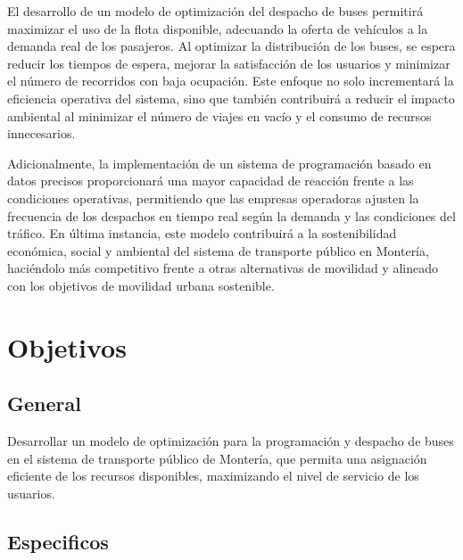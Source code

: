 \documentclass[preprint,11pt]{elsarticle}
\begin{document}
El desarrollo de un modelo de optimización del despacho de buses permitirá maximizar el uso de la flota disponible, adecuando la oferta de vehículos a la demanda real de los pasajeros. Al optimizar la distribución de los buses, se espera reducir los tiempos de espera, mejorar la satisfacción de los usuarios y minimizar el número de recorridos con baja ocupación. Este enfoque no solo incrementará la eficiencia operativa del sistema, sino que también contribuirá a reducir el impacto ambiental al minimizar el número de viajes en vacío y el consumo de recursos innecesarios.

Adicionalmente, la implementación de un sistema de programación basado en datos precisos proporcionará una mayor capacidad de reacción frente a las condiciones operativas, permitiendo que las empresas operadoras ajusten la frecuencia de los despachos en tiempo real según la demanda y las condiciones del tráfico. En última instancia, este modelo contribuirá a la sostenibilidad económica, social y ambiental del sistema de transporte público en Montería, haciéndolo más competitivo frente a otras alternativas de movilidad y alineado con los objetivos de movilidad urbana sostenible.

\section*{Objetivos}

\subsection*{General}

Desarrollar un modelo de optimización para la programación y despacho de buses en el sistema de transporte público de Montería, que permita una asignación eficiente de los recursos disponibles, maximizando el nivel de servicio de los usuarios.

\subsection*{Especificos}
\end{document}
